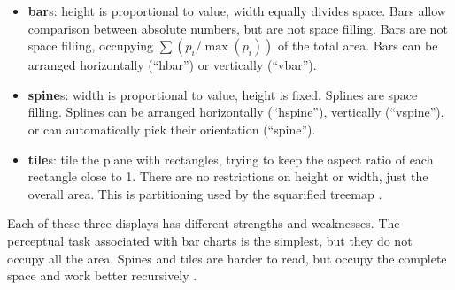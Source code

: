 \documentclass[letterpaper,oneside]{scrartcl}
\begin{document}
\begin{itemize}

  \item {\bf bar}s: height is proportional to value, width equally divides space. Bars allow comparison between absolute numbers, but are not space filling. Bars are not space filling, occupying $\sum(p_i / \max(p_i))$ of the total area. Bars can be arranged horizontally (``hbar'') or vertically (``vbar'').

  \item {\bf spine}s: width is proportional to value, height is fixed. Splines are space filling. Splines can be arranged horizontally (``hspine''), vertically (``vspine''), or can automatically pick their orientation (``spine'').

  \item {\bf tile}s: tile the plane with rectangles, trying to keep the aspect ratio of each rectangle close to 1. There are no restrictions on height or width, just the overall area. This is partitioning used by the squarified treemap \citep{bruls:1999}.

\end{itemize}

Each of these three displays has different strengths and weaknesses.  The perceptual task associated with bar charts is the simplest, but they do not occupy all the area. Spines and tiles are harder to read, but occupy the complete space and work better recursively \citep{heer:2010}.
\end{document}
